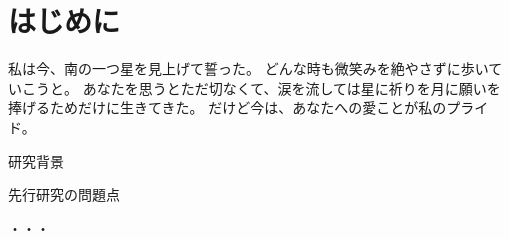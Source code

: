 
\section{はじめに}
私は今、南の一つ星を見上げて誓った。
どんな時も微笑みを絶やさずに歩いていこうと。
あなたを思うとただ切なくて、涙を流しては星に祈りを月に願いを捧げるためだけに生きてきた。
だけど今は、あなたへの愛ことが私のプライド。


研究背景

先行研究の問題点

・・・

